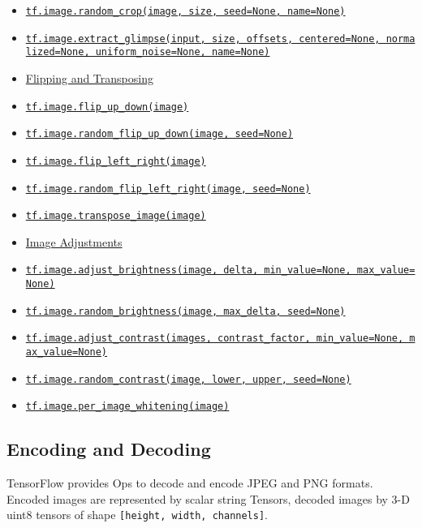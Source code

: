 \begin{itemize}
\item
  \protect\hyperlink{randomux5fcrop}{\texttt{tf.image.random\_crop(image,\ size,\ seed=None,\ name=None)}}
\item
  \protect\hyperlink{extractux5fglimpse}{\texttt{tf.image.extract\_glimpse(input,\ size,\ offsets,\ centered=None,\ normalized=None,\ uniform\_noise=None,\ name=None)}}
\item
  \protect\hyperlink{AUTOGENERATED-flipping-and-transposing}{Flipping
  and Transposing}
\item
  \protect\hyperlink{flipux5fupux5fdown}{\texttt{tf.image.flip\_up\_down(image)}}
\item
  \protect\hyperlink{randomux5fflipux5fupux5fdown}{\texttt{tf.image.random\_flip\_up\_down(image,\ seed=None)}}
\item
  \protect\hyperlink{flipux5fleftux5fright}{\texttt{tf.image.flip\_left\_right(image)}}
\item
  \protect\hyperlink{randomux5fflipux5fleftux5fright}{\texttt{tf.image.random\_flip\_left\_right(image,\ seed=None)}}
\item
  \protect\hyperlink{transposeux5fimage}{\texttt{tf.image.transpose\_image(image)}}
\item
  \protect\hyperlink{AUTOGENERATED-image-adjustments}{Image Adjustments}
\item
  \protect\hyperlink{adjustux5fbrightness}{\texttt{tf.image.adjust\_brightness(image,\ delta,\ min\_value=None,\ max\_value=None)}}
\item
  \protect\hyperlink{randomux5fbrightness}{\texttt{tf.image.random\_brightness(image,\ max\_delta,\ seed=None)}}
\item
  \protect\hyperlink{adjustux5fcontrast}{\texttt{tf.image.adjust\_contrast(images,\ contrast\_factor,\ min\_value=None,\ max\_value=None)}}
\item
  \protect\hyperlink{randomux5fcontrast}{\texttt{tf.image.random\_contrast(image,\ lower,\ upper,\ seed=None)}}
\item
  \protect\hyperlink{perux5fimageux5fwhitening}{\texttt{tf.image.per\_image\_whitening(image)}}
\end{itemize}

\subsection{Encoding and Decoding }\label{encoding-and-decoding}

TensorFlow provides Ops to decode and encode JPEG and PNG formats.
Encoded images are represented by scalar string Tensors, decoded images
by 3-D uint8 tensors of shape \texttt{{[}height,\ width,\ channels{]}}.

